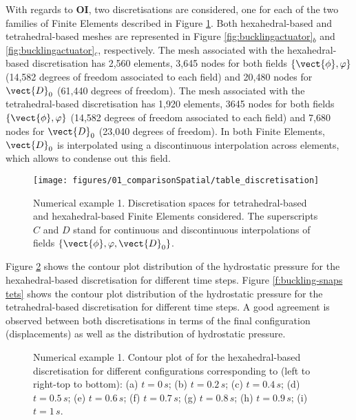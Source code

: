 With regards to \textbf{OI}, two discretisations are considered, one for each of the two families of Finite Elements described in Figure \ref{fig:discretisation table}. Both hexahedral-based and tetrahedral-based meshes are represented in Figure \ref{fig:bucklingactuator}$_b$ and \ref{fig:bucklingactuator}$_c$, respectively.
The mesh associated with the hexahedral-based discretisation has 2,560 elements, 3,645 nodes for both fields $\{\vect{\phi},\varphi\}$ (14,582 degrees of freedom associated to each field) and 20,480 nodes for $\vect{D}_0$ (61,440 degrees of freedom). The mesh associated with the tetrahedral-based discretisation has 1,920 elements, 3645 nodes for both fields $\{\vect{\phi},\varphi\}$ (14,582 degrees of freedom associated to each field) and 7,680 nodes for $\vect{D}_0$ (23,040 degrees of freedom). In both Finite Elements, $\vect{D}_0$ is interpolated using a discontinuous interpolation across elements, which allows to condense out this field.
%
\begin{figure}[htbp]
	\begin{center}
		\texttt{[image: figures/01\_comparisonSpatial/table\_discretisation]}
	\end{center}
	\vspace{-4mm}
	\caption{Numerical example 1. Discretisation spaces for tetrahedral-based and hexahedral-based Finite Elements considered. The superscripts $C$ and $D$ stand for continuous and discontinuous interpolations of fields $\{\vect{\phi},\varphi,\vect{D}_0\}$.} 
\label{fig:discretisation table}	
\end{figure}



Figure \ref{f:buckling-snaps hexas} shows the contour plot distribution of the hydrostatic pressure for the hexahedral-based discretisation for different time steps. Figure \ref{f:buckling-snaps tets} shows the contour plot distribution of the hydrostatic pressure for the tetrahedral-based discretisation for different time steps. A good agreement is observed between both discretisations in terms of the final configuration (displacements) as well as the distribution of hydrostatic pressure. 
%
\begin{figure}[htbp]
	\centering
	\caption{Numerical example 1. Contour plot of  for the hexahedral-based discretisation for different configurations corresponding to (left to right-top to bottom): (a) $t=0\,s$;  (b) $t=0.2\,s$; (c) $t=0.4\,s$; (d) $t=0.5\,s$; (e) $t=0.6\,s$; (f) $t=0.7\,s$; (g) $t=0.8\,s$; (h) $t=0.9\,s$; (i) $t=1\,s$.}
	\label{f:buckling-snaps hexas}
\end{figure}

